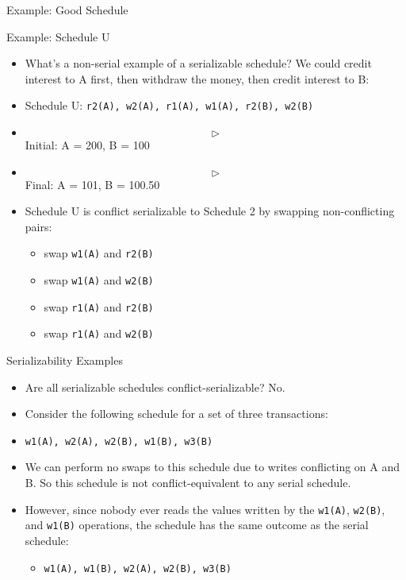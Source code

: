 \documentclass[aspectratio=169, xcolor=dvipsnames]{beamer}
\begin{document}
\begin{frame}{Example: Good Schedule}
    \begin{exampleblock}{Example: Schedule U}
        \begin{itemize}[<+->]
            \item What's a non-serial example of a serializable schedule? We could credit interest to A first, then withdraw the money, then credit interest to B:
            \item Schedule U: \texttt{r2(A), w2(A), r1(A), w1(A), r2(B), w2(B)}
            \item $$\triangleright$$ Initial: A = 200, B = 100
            \item $$\triangleright$$ Final: A = 101, B = 100.50
        \end{itemize}
    \end{exampleblock}
    \begin{itemize}[<+->]
        \item Schedule U is conflict serializable to Schedule 2 by swapping non-conflicting pairs:
        \begin{itemize}[<+->]
            \item swap \texttt{w1(A)} and \texttt{r2(B)}
            \item swap \texttt{w1(A)} and \texttt{w2(B)}
            \item swap \texttt{r1(A)} and \texttt{r2(B)}
            \item swap \texttt{r1(A)} and \texttt{w2(B)}
        \end{itemize}
    \end{itemize}
\end{frame}

\begin{frame}{Serializability Examples}
    \begin{itemize}[<+->]
        \item Are all serializable schedules conflict-serializable? No.
        \item Consider the following schedule for a set of three transactions:
        \item \texttt{w1(A), w2(A), w2(B), w1(B), w3(B)}
        \item We can perform no swaps to this schedule due to writes conflicting on A and B. So this schedule is not conflict-equivalent to any serial schedule.
        \item However, since nobody ever reads the values written by the \texttt{w1(A)}, \texttt{w2(B)}, and \texttt{w1(B)} operations, the schedule has the same outcome as the serial schedule:
        \begin{itemize}[<+->]
            \item \texttt{w1(A), w1(B), w2(A), w2(B), w3(B)}
        \end{itemize}
    \end{itemize}
\end{frame}
\end{document}
